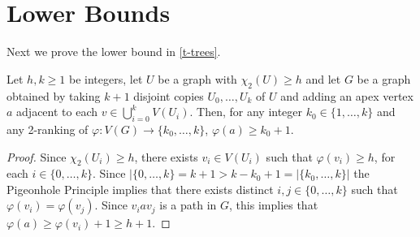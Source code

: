 \documentclass[kpfonts]{patmorin}
\DeclareMathOperator{\pw}{pw}
\newcommand{\trn}{\chi_2}
\theoremstyle{named}
\begin{document}
%
%
%
%
%
%

\section{Lower Bounds}
\label{lower-bounds}

Next we prove the lower bound in \cref{t-trees}.

\begin{lem}\label{apex-graph}
    Let $h,k\ge 1$ be integers, let $U$ be a graph with $\trn(U)\ge h$ and let $G$ be a graph obtained by taking $k+1$ disjoint copies $U_0,\ldots,U_k$ of $U$ and adding an apex vertex $a$ adjacent to each $v\in\bigcup_{i=0}^k V(U_i)$.  Then, for any integer $k_0\in \{1,\ldots,k\}$ and any 2-ranking of $\varphi:V(G)\to\{k_0,\ldots,k\}$, $\varphi(a) \ge k_0+1$.
\end{lem}

\begin{proof}
    Since $\trn(U_i)\ge h$, there exists $v_i\in V(U_i)$ such that $\varphi(v_i)\ge h$, for each $i\in\{0,\ldots,k\}$.  Since $|\{0,\ldots,k\}=k+1>k-k_0+1=|\{k_0,\ldots,k\}|$ the Pigeonhole Principle implies that there exists distinct $i,j\in\{0,\ldots,k\}$ such that $\varphi(v_i)=\varphi(v_j)$.  Since $v_i a v_j$ is a path in $G$, this implies that $\varphi(a)\ge \varphi(v_i)+1\ge h+1$.
\end{proof}
\end{document}
